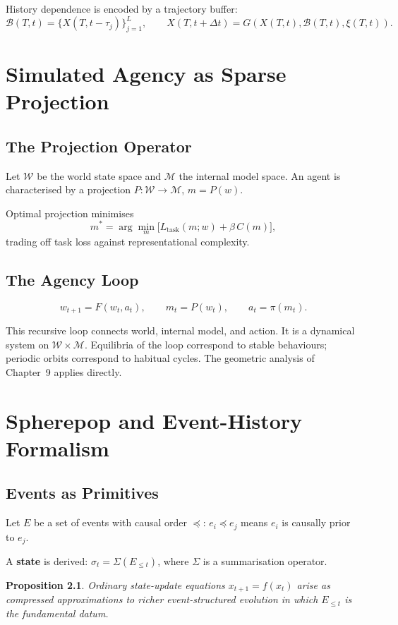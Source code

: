 \documentclass[11pt, openany]{book}
\theoremstyle{plain}
\newtheorem{proposition}[theorem]{Proposition}
\theoremstyle{definition}
\theoremstyle{remark}
\begin{document}
History dependence is encoded by a trajectory buffer:
\[
  \mathcal{B}(T,t)=\{X(T,t-\tau_j)\}_{j=1}^L,\qquad
  X(T,t+\Delta t)=G\!\left(X(T,t),\mathcal{B}(T,t),\xi(T,t)\right).
\]

\chapter{Simulated Agency as Sparse Projection}

\section{The Projection Operator}

Let $\mathcal{W}$ be the world state space and $\mathcal{M}$ the internal
model space. An agent is characterised by a projection
$P:\mathcal{W}\to\mathcal{M}$, $m=P(w)$.

Optimal projection minimises
\[
  m^* = \arg\min_m\bigl[L_\text{task}(m;w)+\beta\,C(m)\bigr],
\]
trading off task loss against representational complexity.

\section{The Agency Loop}

\[
  w_{t+1}=F(w_t,a_t),\qquad
  m_t=P(w_t),\qquad
  a_t=\pi(m_t).
\]

This recursive loop connects world, internal model, and action. It is a
dynamical system on $\mathcal{W}\times\mathcal{M}$. Equilibria of the loop
correspond to stable behaviours; periodic orbits correspond to habitual
cycles. The geometric analysis of Chapter~9 applies directly.

\chapter{Spherepop and Event-History Formalism}

\section{Events as Primitives}

Let $E$ be a set of events with causal order $\preceq$: $e_i\preceq e_j$
means $e_i$ is causally prior to $e_j$.

A \textbf{state} is derived:
$\sigma_t=\Sigma(E_{\le t})$, where $\Sigma$ is a summarisation operator.

\begin{proposition}
Ordinary state-update equations $x_{t+1}=f(x_t)$ arise as compressed
approximations to richer event-structured evolution in which $E_{\le t}$
is the fundamental datum.
\end{proposition}
\end{document}
